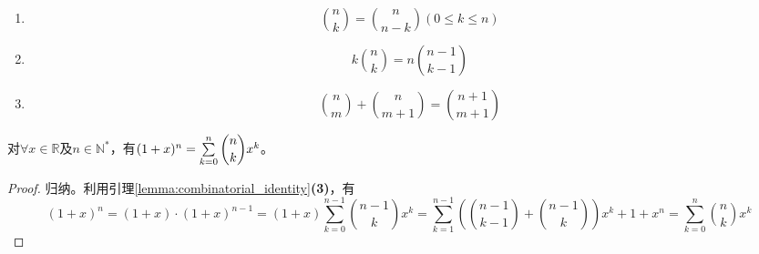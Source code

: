             \begin{lemma}
                \label{lemma:combinatorial_identity}
                \begin{enumerate}
                    \item
                        \begin{equation*}
                            \binom{n}{k}=\binom{n}{n-k}(0\leq k\leq n)
                        \end{equation*}
                    \item
                        \begin{equation*}
                            k\binom{n}{k}=n\binom{n-1}{k-1}
                        \end{equation*}
                    \item
                        \begin{equation*}
                            \binom{n}{m}+\binom{n}{m+1}=\binom{n+1}{m+1}
                        \end{equation*}
                \end{enumerate}
            \end{lemma}

            \begin{theorem}[二项式定理]
                对$\forall x\in \mathbb{R}$及$n\in \mathbb{N}^*$，有$(1+x)^n=\sum\limits_{k=0}^{n}\dbinom{n}{k}x^{k}$。
            \end{theorem}

            \begin{proof}
                归纳。利用引理\ref{lemma:combinatorial_identity}\textbf{(3)}，有
                \begin{equation*}
                    (1+x)^n=(1+x)\cdot(1+x)^{n-1}=(1+x)\sum_{k=0}^{n-1}\binom{n-1}{k}x^{k}=\sum_{k=1}^{n-1}\left(\binom{n-1}{k-1}+\binom{n-1}{k}\right)x^{k}+1+x^n=\sum_{k=0}^{n}\binom{n}{k}x^{k}
                \end{equation*}
            \end{proof}

